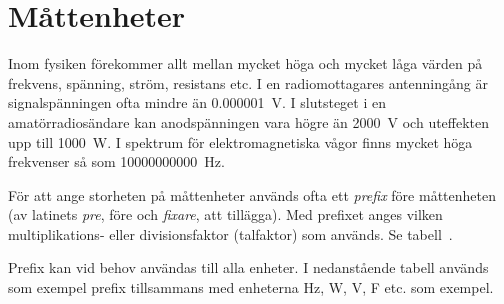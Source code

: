 \chapter{Måttenheter}
\label{app:mattenheter}

\noindent Inom fysiken förekommer allt mellan mycket höga och mycket
låga värden på frekvens, spänning, ström, resistans etc.
I en radiomottagares antenningång är signalspänningen ofta mindre än
\qty{0,000001}{\volt}.
I slutsteget i en amatörradiosändare kan anodspänningen vara högre än
\qty{2000}{\volt} och uteffekten upp till \qty{1000}{\watt}.
I spektrum för elektromagnetiska vågor finns mycket höga frekvenser så som
\qty{10000000000}{\hertz}.

För att ange storheten på måttenheter används ofta ett \emph{prefix}
före måttenheten (av latinets \emph{pre}, före och \emph{fixare}, att
tillägga).
Med prefixet anges vilken multiplikations- eller divisionsfaktor (talfaktor)
som används. Se tabell~.

Prefix kan vid behov användas till alla enheter.
I nedanstående tabell används som exempel prefix tillsammans med enheterna
\unit{\hertz}, \unit{\watt}, \unit{\volt}, \unit{\farad} etc. som exempel.


